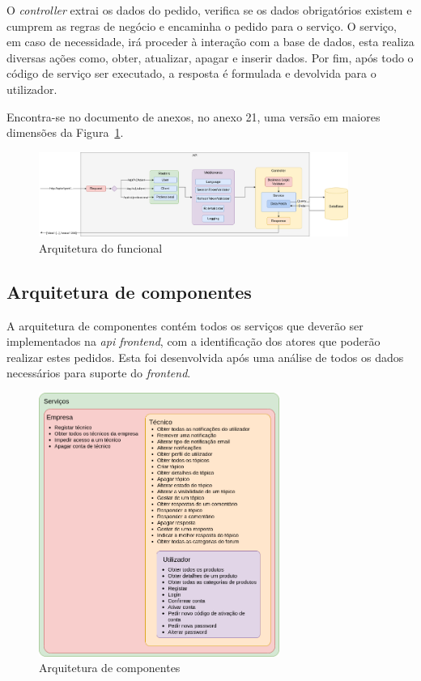 O \textit{controller} extrai os dados do pedido, verifica se os dados obrigatórios existem e cumprem as regras de negócio e encaminha o pedido para o serviço. O serviço, em caso de necessidade, irá proceder à interação com a base de dados, esta realiza diversas ações como, obter, atualizar, apagar e inserir dados. Por fim, após todo o código de serviço ser executado, a resposta é formulada e devolvida para o utilizador.

Encontra-se no documento de anexos, no anexo 21, uma versão em maiores dimensões da Figura~\ref*{fig:47}.

\begin{figure}[htb]
  \centering
  \includegraphics[width=0.9\textwidth]{images/Arquiteturas/arquitetura_funcional.png}
  \caption{Arquitetura do funcional}
  \label{fig:47}
\end{figure}

\newpage

\subsection{Arquitetura de componentes}
A arquitetura de componentes contém todos os serviços que deverão ser implementados na \textit{api frontend}, com a identificação dos atores que poderão realizar estes pedidos. Esta foi desenvolvida após uma análise de todos os dados necessários para suporte do \textit{frontend}.

\begin{figure}[htb]
  \centering
  \includegraphics[width=0.7\textwidth]{images/Arquiteturas/arquitetura_de_componentes_final.png}
  \caption{Arquitetura de componentes}
  \label{fig:48}
\end{figure}

